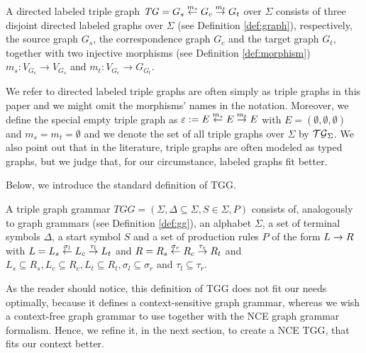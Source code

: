 \documentclass[runningheads]{llncs}
\begin{document}
\begin{definition}
	A directed labeled triple graph $\mathit{TG} = G_s \overset{m_s}{\leftarrow} G_c \overset{m_t}{\rightarrow} G_t$ over $\Sigma$ consists of three disjoint directed labeled graphs over $\Sigma$ (see Definition \ref{def:graph}), respectively, the source graph $G_s$, the correspondence graph $G_c$ and the target graph $G_t$, together with two injective morphisms (see Definition \ref{def:morphism}) $m_s: V_{G_c} \to V_{G_s}$ and $m_t : V_{G_c} \to G_{G_t}$.
\end{definition}

We refer to directed labeled triple graphs are often simply as triple graphs in this paper and we might omit the morphisms' names in the notation. Moreover, we define the special empty triple graph as $\varepsilon := E \overset{m_s}{\leftarrow} E \overset{m_t}{\rightarrow} E$ with $E = (\emptyset, \emptyset, \emptyset)$ and $m_s = m_t = \emptyset$ and we denote the set of all triple graphs over $\Sigma$ by $\mathcal{TG}_{\Sigma}$. We also point out that in the literature, triple graphs are often modeled as typed graphs, but we judge that, for our circumstance, labeled graphs fit better.


Below, we introduce the standard definition of TGG.

\begin{definition}
	\label{def:stgg}
	A triple graph grammar $\mathit{TGG} = (\Sigma, \Delta \subseteq \Sigma, S \in \Sigma, P)$ consists of, analogously to graph grammars (see Definition \ref{def:gg}), an alphabet $\Sigma$, a set of terminal symbols $\Delta$, a start symbol $S$ and a set of production rules $P$ of the form $L \to R$ with $L = L_s \overset{\sigma_l}{\leftarrow} L_c \overset{\tau_l}{\rightarrow} L_t$ and $R = R_s \overset{\sigma_r}{\leftarrow} R_c \overset{\tau_r}{\rightarrow} R_t$ and $L_s \subseteq R_s, L_c \subseteq R_c, L_t \subseteq R_t, \sigma_l \subseteq \sigma_r$ and $\tau_l \subseteq \tau_r$.
\end{definition}

As the reader should notice, this definition of TGG does not fit our needs optimally, because it defines a context-sensitive graph grammar, whereas we wish a context-free graph grammar to use together with the NCE graph grammar formalism. Hence, we refine it, in the next section, to create a NCE TGG, that fits our context better.
\end{document}
